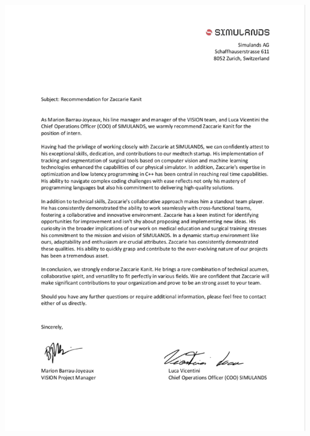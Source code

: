 \documentclass[a4paper, 10pt]{article}
\begin{document}
\if{}
\newpage
\includegraphics[width= 1.03\columnwidth]{images/recommendation_letter_zaccarie.pdf}
\fi
\end{document}
